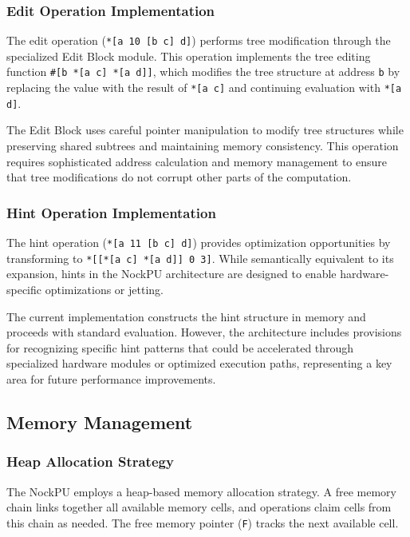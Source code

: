 \documentclass[twoside]{article}
\begin{document}
\subsubsection{Edit Operation Implementation}

The edit operation (\texttt{*[a 10 [b c] d]}) performs tree modification through the specialized Edit Block module. This operation implements the tree editing function \texttt{\#[b *[a c] *[a d]]}, which modifies the tree structure at address \texttt{b} by replacing the value with the result of \texttt{*[a c]} and continuing evaluation with \texttt{*[a d]}.

The Edit Block uses careful pointer manipulation to modify tree structures while preserving shared subtrees and maintaining memory consistency. This operation requires sophisticated address calculation and memory management to ensure that tree modifications do not corrupt other parts of the computation.

\subsubsection{Hint Operation Implementation}

The hint operation (\texttt{*[a 11 [b c] d]}) provides optimization opportunities by transforming to \texttt{*[[*[a c] *[a d]] 0 3]}. While semantically equivalent to its expansion, hints in the NockPU architecture are designed to enable hardware-specific optimizations or jetting.

The current implementation constructs the hint structure in memory and proceeds with standard evaluation. However, the architecture includes provisions for recognizing specific hint patterns that could be accelerated through specialized hardware modules or optimized execution paths, representing a key area for future performance improvements.

\subsection{Memory Management}

\subsubsection{Heap Allocation Strategy}

The NockPU employs a heap-based memory allocation strategy. A free memory chain links together all available memory cells, and operations claim cells from this chain as needed. The free memory pointer (\texttt{F}) tracks the next available cell.
\end{document}
